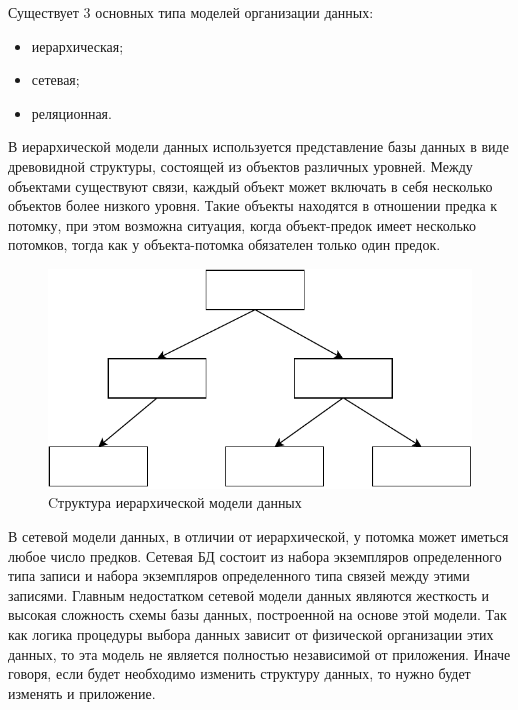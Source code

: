 Существует 3 основных типа моделей организации данных:
\begin{itemize}
	\item иерархическая;
	\item сетевая;
	\item реляционная.
\end{itemize}

В иерархической модели данных используется представление базы данных в виде древовидной структуры, состоящей из объектов различных уровней. Между объектами существуют связи, каждый объект может включать в себя несколько объектов более низкого уровня. Такие объекты находятся в отношении предка к потомку, при этом возможна ситуация, когда объект-предок имеет несколько потомков, тогда как у объекта-потомка обязателен только один предок.

\begin{figure}[h!]
	\begin{center}
		\includegraphics[scale=0.6]{assets/bd_scheme_1.pdf}
	\end{center}
	\caption{Cтруктура иерархической модели данных}
	\label{bd_scheme_1}
\end{figure}

В сетевой модели данных, в отличии от иерархической, у потомка может иметься любое число предков. Сетевая БД состоит из набора экземпляров определенного типа записи и набора экземпляров определенного типа связей между этими записями.
Главным недостатком сетевой модели данных являются жесткость и высокая сложность схемы базы данных, построенной на основе этой модели. Так как логика процедуры выбора данных зависит от физической организации этих данных, то эта модель не является полностью независимой от приложения. Иначе говоря, если будет необходимо изменить структуру данных, то нужно будет изменять и приложение.

